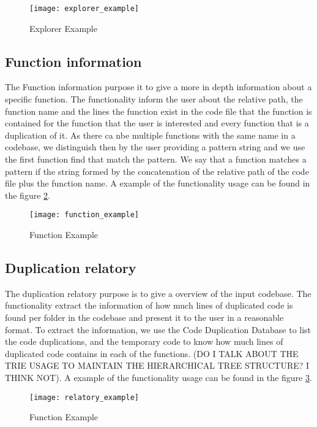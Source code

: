 \begin{figure}
\texttt{[image: explorer\_example]}
\caption{Explorer Example}
\label{fig:explorer_ex}
\end{figure}


\subsection{Function information}

\label{subsec:functioncommand}

The Function information purpose it to give a more in depth information about a specific function. The functionality inform the user
about the relative path, the function name and the lines the function exist in the code file that the function is contained for the
function that the user is interested and every function that is a duplication of it. As there ca nbe multiple functions with the 
same name in a codebase, we distinguish then by the user providing a pattern string and we use the first function find that match
the pattern. We say that a function matches a pattern if the string formed by the concatenation of the relative path of the 
code file plus the function name. 
A example of the functionality usage can be found in the figure \ref{fig:function_ex}.


\begin{figure}
\texttt{[image: function\_example]}
\caption{Function Example}
\label{fig:function_ex}
\end{figure}


\subsection{Duplication relatory}

The duplication relatory purpose is to give a overview of the input codebase. The functionality extract the information
of how much lines of duplicated code is found per folder in the codebase and present it to the user in a reasonable format. To extract
the information, we use the Code Duplication Database to list the code duplications, and the temporary code to know how much lines of
duplicated code contains in each of the functions. (DO I TALK ABOUT THE TRIE USAGE TO MAINTAIN THE HIERARCHICAL TREE STRUCTURE? I 
THINK NOT). A example of the functionality usage can be found in the figure \ref{fig:relatory_ex}.

\begin{figure}
\texttt{[image: relatory\_example]}
\caption{Function Example}
\label{fig:relatory_ex}
\end{figure}





